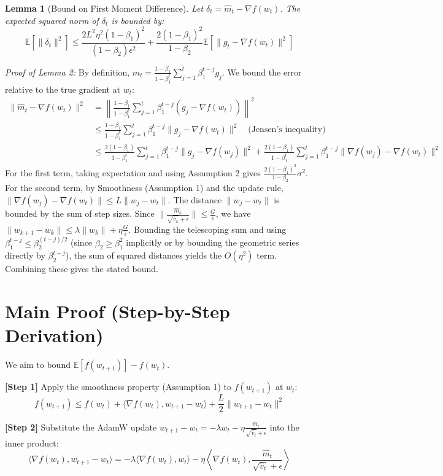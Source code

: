 \documentclass{article}
\newtheorem{lemma}[theorem]{Lemma}
\begin{document}
\begin{lemma}[Bound on First Moment Difference]
Let $\delta_t = \hat{m}_t - \nabla f(w_t)$. The expected squared norm of $\delta_t$ is bounded by:
$$ \mathbb{E}[\|\delta_t\|^2] \leq \frac{2 L^2 \eta^2 (1-\beta_1)^2}{(1-\beta_2) \epsilon^2} + \frac{2(1-\beta_1)^2}{1-\beta_2} \mathbb{E}[\|g_t - \nabla f(w_t)\|^2] $$
\end{lemma}
\textit{Proof of Lemma 2:}
By definition, $\hat{m}_t = \frac{1-\beta_1}{1-\beta_1^t} \sum_{j=1}^t \beta_1^{t-j} g_j$. We bound the error relative to the true gradient at $w_t$:
\begin{align*}
\|\hat{m}_t - \nabla f(w_t)\|^2 &= \left\| \frac{1-\beta_1}{1-\beta_1^t} \sum_{j=1}^t \beta_1^{t-j} (g_j - \nabla f(w_t)) \right\|^2 \\
&\leq \frac{1-\beta_1}{1-\beta_1^t} \sum_{j=1}^t \beta_1^{t-j} \|g_j - \nabla f(w_t)\|^2 \quad \text{(Jensen's inequality)} \\
&\leq \frac{2(1-\beta_1)}{1-\beta_1^t} \sum_{j=1}^t \beta_1^{t-j} \|g_j - \nabla f(w_j)\|^2 + \frac{2(1-\beta_1)}{1-\beta_1^t} \sum_{j=1}^t \beta_1^{t-j} \|\nabla f(w_j) - \nabla f(w_t)\|^2
\end{align*}
For the first term, taking expectation and using Assumption 2 gives $\frac{2(1-\beta_1)^2}{1-\beta_2} \sigma^2$. For the second term, by Smoothness (Assumption 1) and the update rule, $\|\nabla f(w_j) - \nabla f(w_t)\| \leq L \|w_j - w_t\|$. The distance $\|w_j - w_t\|$ is bounded by the sum of step sizes. Since $\|\frac{\hat{m}_k}{\sqrt{\hat{v}_k}+\epsilon}\| \leq \frac{G}{\epsilon}$, we have $\|w_{k+1} - w_k\| \leq \lambda \|w_k\| + \eta \frac{G}{\epsilon}$. Bounding the telescoping sum and using $\beta_1^{t-j} \leq \beta_2^{(t-j)/2}$ (since $\beta_2 \geq \beta_1^2$ implicitly or by bounding the geometric series directly by $\beta_2^{t-j}$), the sum of squared distances yields the $O(\eta^2)$ term. Combining these gives the stated bound.

\section*{Main Proof (Step-by-Step Derivation)}
We aim to bound $\mathbb{E}[f(w_{t+1})] - f(w_t)$.

\textbf{[Step 1]} Apply the smoothness property (Assumption 1) to $f(w_{t+1})$ at $w_t$:
$$ f(w_{t+1}) \leq f(w_t) + \langle \nabla f(w_t), w_{t+1} - w_t \rangle + \frac{L}{2} \|w_{t+1} - w_t\|^2 $$

\textbf{[Step 2]} Substitute the AdamW update $w_{t+1} - w_t = -\lambda w_t - \eta \frac{\hat{m}_t}{\sqrt{\hat{v}_t} + \epsilon}$ into the inner product:
$$ \langle \nabla f(w_t), w_{t+1} - w_t \rangle = -\lambda \langle \nabla f(w_t), w_t \rangle - \eta \left\langle \nabla f(w_t), \frac{\hat{m}_t}{\sqrt{\hat{v}_t} + \epsilon} \right\rangle $$
\end{document}
